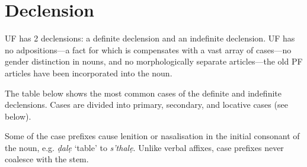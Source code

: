 \documentclass[a4paper, 12pt, twoside, openright, final]{book}
\let \w \textit
\begin{document}
\section{Declension}\label{subsubsec:declension}
UF has 2 declensions: a definite declension and an indefinite declension. UF has no adpositions—a fact for which is
compensates with a vast array of cases—no gender distinction in nouns, and no morphologically separate articles—the old
PF articles have been incorporated into the noun.

The table below shows the most common cases of the definite and indefinite declensions.  Cases are divided into primary,
secondary, and locative cases (see below).

Some of the case prefixes cause lenition or nasalisation in the initial consonant of the noun, e.g. \w{ḍalẹ} ‘table’ to
 \w{s’thalẹ}. Unlike verbal affixes, case prefixes never coalesce with the stem.
\end{document}
